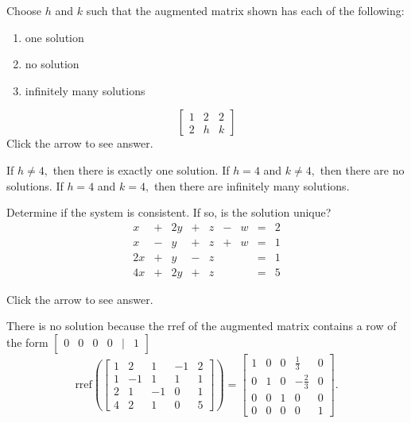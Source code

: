 \documentclass{ximera}
\begin{document}
\begin{problem}\label{prb:2.14}
Choose $h$ and $k$ such that the augmented matrix shown has each of the following:
\begin{enumerate}
\item one solution
\item no solution
\item infinitely many solutions
\end{enumerate}
\begin{equation*}
\left[
\begin{array}{rr|r}
1 & 2 & 2 \\
2 & h & k
\end{array}
\right]
\end{equation*}
Click the arrow to see answer. 
\begin{expandable}
If $h\neq 4,$ then there is exactly one solution. If $h=4$ and $k\neq 4,$
then there are no solutions. If $h=4$ and $k=4,$ then there are infinitely
many solutions.
\end{expandable}
\end{problem}

\begin{problem}\label{prb:2.15}
Determine if the system is consistent. If so, is the solution unique?
$$\begin{array}{ccccccccc}
      x & +&2y&+&z&-&w&= &2 \\
	 x& -&y&+&z&+&w&=&1\\
     2x& +&y&-&z&&&=&1\\
     4x&+&2y&+&z&&&=&5
    \end{array}$$

Click the arrow to see answer. 
\begin{expandable}
There is no solution because the rref of the augmented matrix contains a row of the form $\begin{bmatrix}0 & 0 & 0 & 0 & | & 1\end{bmatrix}$ $$\mbox{rref}\left(\left[
\begin{array}{rrrr|r}
1 & 2 & 1 & -1 & 2 \\
1 & -1 & 1 & 1 & 1 \\
2 & 1 & -1 & 0 & 1 \\
4 & 2 & 1 & 0 & 5
\end{array}
\right]\right) = \left[
\begin{array}{rrrr|r}
1 & 0 & 0 &  \frac{1}{3} & 0 \\
0 & 1 & 0 & - \frac{2}{3} & 0 \\
0 & 0 & 1 & 0 & 0 \\
0 & 0 & 0 & 0 & 1
\end{array}
\right] .$$
\end{expandable}
\end{problem}
\end{document}
